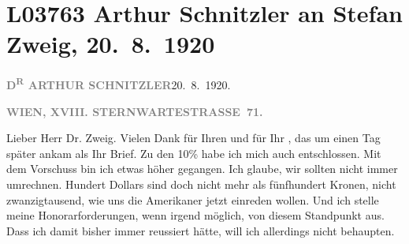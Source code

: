 

\section[Arthur Schnitzler an Stefan Zweig, 20. 8. 1920]{L03763 Arthur Schnitzler an Stefan Zweig, 20. 8. 1920}
\nopagebreak{}
\rehead{ }\normalsize\beginnumbering{}
\toendnotes[C]{\smallbreak\pagebreak[2]}
\toendnotes[C]{\smallbreak}
\pstart
           {\pb}\textcolor{gray}{\textbf{D\textsuperscript{R} ARTHUR SCHNITZLER}}\hfill 20. 8. 1920. \pend
           
\pstart
           \textcolor{gray}{\textbf{WIEN, XVIII.
                              STERNWARTESTRASSE 71.}}\pend
           
\pstart{}Lieber Herr Dr. Zweig.\pend\vspace{0.5em}
\pstart
           Vielen Dank für Ihren \label{K_L03763-1v}\label{K_L03763-1} und für Ihr \label{K_L03763-2v}\label{K_L03763-2}, das um einen Tag später ankam als
               Ihr Brief. Zu den 10{\%} habe ich mich auch entschlossen. Mit
               dem Vorschuss bin ich etwas höher gegangen. Ich glaube, wir sollten nicht immer
               umrechnen. Hundert Dollars sind doch nicht mehr als fünfhundert Kronen, nicht
               zwanzigtausend, wie uns die Amerikaner jetzt
               einreden wollen. Und ich stelle meine Honorarforderungen, wenn irgend möglich, von
               diesem Standpunkt aus. Dass ich damit bisher immer reussiert hätte, will ich
               allerdings nicht behaupten. \pend
           
